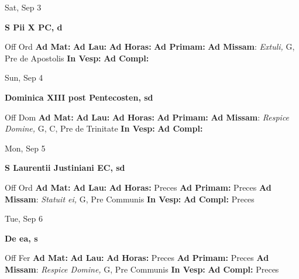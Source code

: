 \documentclass[10pt]{article}
\begin{document}
\begin{minipage}{3.5in}
\vspace{2em}\begin{center}
Sat, Sep 3
\end{center}\textbf{ \large S Pii X PC, \textnormal{\normalsize d}}
\begin{justify}
Off Ord
\textbf{Ad Mat: }
\textbf{Ad Lau: }
\textbf{Ad Horas: }
\textbf{Ad Primam: }
\textbf{Ad Missam}: \textit{Extuli,} G, Pre de Apostolis
\textbf{In Vesp: }
\textbf{Ad Compl: }\end{justify}
\end{minipage}



\begin{minipage}{3.5in}
\vspace{2em}\begin{center}
Sun, Sep 4
\end{center}\textbf{ \large Dominica XIII post Pentecosten, \textnormal{\normalsize sd}}
\begin{justify}
Off Dom
\textbf{Ad Mat: }
\textbf{Ad Lau: }
\textbf{Ad Horas: }
\textbf{Ad Primam: }
\textbf{Ad Missam}: \textit{Respice Domine,} G, C, Pre de Trinitate
\textbf{In Vesp: }
\textbf{Ad Compl: }\end{justify}
\end{minipage}



\begin{minipage}{3.5in}
\vspace{2em}\begin{center}
Mon, Sep 5
\end{center}\textbf{ \large S Laurentii Justiniani EC, \textnormal{\normalsize sd}}
\begin{justify}
Off Ord
\textbf{Ad Mat: }
\textbf{Ad Lau: }
\textbf{Ad Horas: }Preces
\textbf{Ad Primam: }Preces
\textbf{Ad Missam}: \textit{Statuit ei,} G, Pre Communis
\textbf{In Vesp: }
\textbf{Ad Compl: }Preces\end{justify}
\end{minipage}



\begin{minipage}{3.5in}
\vspace{2em}\begin{center}
Tue, Sep 6
\end{center}\textbf{ \large De ea, \textnormal{\normalsize s}}
\begin{justify}
Off Fer
\textbf{Ad Mat: }
\textbf{Ad Lau: }
\textbf{Ad Horas: }Preces
\textbf{Ad Primam: }Preces
\textbf{Ad Missam}: \textit{Respice Domine,} G, Pre Communis
\textbf{In Vesp: }
\textbf{Ad Compl: }Preces\end{justify}
\end{minipage}
\end{document}
